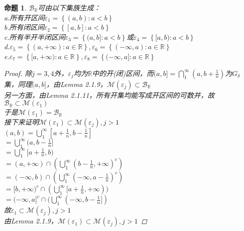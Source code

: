 \documentclass[12pt, a4paper, oneside]{ctexbook}
\newtheorem{proposition}[theorem]{命题}
\begin{document}
\begin{proposition}
    $\mathcal{B}_{\mathbb{R}}$可由以下集族生成：\\
    a.所有开区间$\varepsilon_1=\left\{(a,b):a<b\right\}$\\
    b.所有闭区间$\varepsilon_2=\left\{[a,b]:a<b\right\}$\\
    c.所有半开半闭区间$\varepsilon_3=\left\{(a,b]:a<b\right\}$或$\varepsilon_4=\left\{[a,b):a<b\right\}$\\
    d.$\varepsilon_5=\left\{(a,+\infty):a\in\mathbb{R}\right\},\varepsilon_6=\left\{(-\infty,a):a\in\mathbb{R}\right\}$\\
    e.$\varepsilon_7=\left\{[a,+\infty):a\in\mathbb{R}\right\},\varepsilon_8=\left\{(-\infty,a]:a\in\mathbb{R}\right\}$
    \begin{proof}
        除$j=3,4$外，$\varepsilon_j$均为$\mathbb{R}$中的开(闭)区间，而$(a,b]=\bigcap_1^{\infty}(a,b+\frac{1}{n})$为$G_{\delta}$\\
        集，同理$(a,b]$，由Lemma 2.1.9，$\mathcal{M}(\varepsilon_j)\subset\mathcal{B}_{\mathbb{R}}$\\
        另一方面，由Lemma 2.1.11，所有开集均能写成开区间的可数并，故$\mathcal{B}_{\mathbb{R}}\subset\mathcal{M}(\varepsilon_1)$\\
        于是$\mathcal{M}(\varepsilon_1)=\mathcal{B}_{\mathbb{R}}$\\
        接下来证明$\mathcal{M}(\varepsilon_1)\subset\mathcal{M}(\varepsilon_j),j>1$\\
        $(a,b)=\bigcup_{1}^{\infty}[a+\frac{1}{n},b-\frac{1}{n}]$\\
        $=\bigcup_1^{\infty}(a,b-\frac{1}{n}]$\\
        $=\bigcup_1^{\infty}[a+\frac{1}{n},b)$\\
        $=(a,+\infty)\cap(\bigcup_{1}^{\infty}(b-\frac{1}{n},+\infty)^c)$\\
        $=(-\infty,b)\cap(\bigcup_1^{\infty}(-\infty,a-\frac{1}{n})^c)$\\
        $=[b,+\infty)^c\cap(\bigcup_1^{\infty}[a+\frac{1}{n},+\infty))$\\
        $=(-\infty,a]^c\cap(\bigcup_1^{\infty}(-\infty,b-\frac{1}{n}])$\\
        故$\varepsilon_1\subset\mathcal{M}(\varepsilon_j),j>1$\\
        由Lemma 2.1.9，$\mathcal{M}(\varepsilon_1)\subset\mathcal{M}(\varepsilon_j),j>1$
    \end{proof}
\end{proposition}
\end{document}
